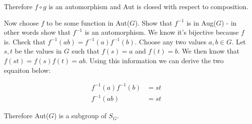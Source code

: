 \documentclass[twoside]{amsart}
\begin{document}
\begin{enumerate}[A.]
\begin{enumerate}[1]
      Therefore $f \circ g$ is an automorphism and Aut is closed with
      respect to composition.


      Now choose $f$ to be some function in Aut($G$). Show that
      $f^{-1}$ is in Aug($G$) - in other words show that $f^{-1}$
      is an automorphism. We know it's bijective because $f$ is.
      Check that $f^{-1}(ab) = f^{-1}(a)f^{-1}(b)$. Choose
      any two values $a,b \in G$. Let $s,t$
      be the values in $G$ such that 
      $f(s)=a$ and $f(t)=b$. We then know that $f(st)=f(s)f(t)=ab$.
      Using this information we can derive the two equaiton below:

      \setcounter{equation}{0}
      \begin{align}
         f^{-1}(a)f^{-1}(b) &= st \\
         f^{-1}(ab) &= st 
      \end{align}

      Therefore Aut($G$) is a subgroup of $S_G$.

      
   \end{enumerate}

\end{enumerate}
\end{document}
